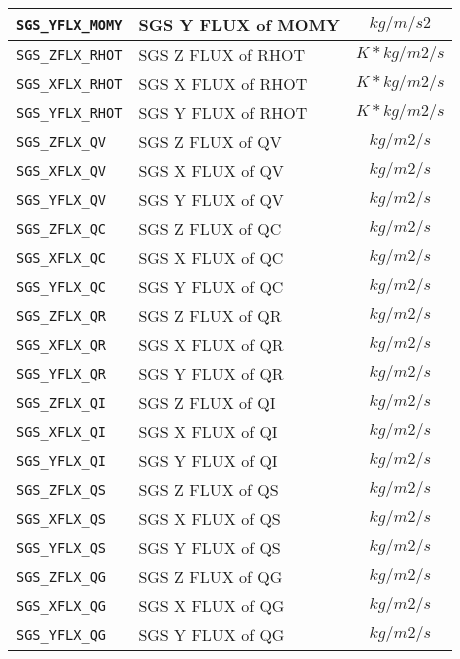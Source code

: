 \begin{tabularx}{150mm}{|l|X|c|}
  \verb|SGS_YFLX_MOMY| & SGS Y FLUX of MOMY & $kg/m/s2$ \\\hline
  \verb|SGS_ZFLX_RHOT| & SGS Z FLUX of RHOT & $K*kg/m2/s$ \\\hline
  \verb|SGS_XFLX_RHOT| & SGS X FLUX of RHOT & $K*kg/m2/s$ \\\hline
  \verb|SGS_YFLX_RHOT| & SGS Y FLUX of RHOT & $K*kg/m2/s$ \\\hline
  \verb|SGS_ZFLX_QV|   & SGS Z FLUX of QV   & $kg/m2/s$ \\\hline
  \verb|SGS_XFLX_QV|   & SGS X FLUX of QV   & $kg/m2/s$ \\\hline
  \verb|SGS_YFLX_QV|   & SGS Y FLUX of QV   & $kg/m2/s$ \\\hline
  \verb|SGS_ZFLX_QC|   & SGS Z FLUX of QC   & $kg/m2/s$ \\\hline
  \verb|SGS_XFLX_QC|   & SGS X FLUX of QC   & $kg/m2/s$ \\\hline
  \verb|SGS_YFLX_QC|   & SGS Y FLUX of QC   & $kg/m2/s$ \\\hline
  \verb|SGS_ZFLX_QR|   & SGS Z FLUX of QR   & $kg/m2/s$ \\\hline
  \verb|SGS_XFLX_QR|   & SGS X FLUX of QR   & $kg/m2/s$ \\\hline
  \verb|SGS_YFLX_QR|   & SGS Y FLUX of QR   & $kg/m2/s$ \\\hline
  \verb|SGS_ZFLX_QI|   & SGS Z FLUX of QI   & $kg/m2/s$ \\\hline
  \verb|SGS_XFLX_QI|   & SGS X FLUX of QI   & $kg/m2/s$ \\\hline
  \verb|SGS_YFLX_QI|   & SGS Y FLUX of QI   & $kg/m2/s$ \\\hline
  \verb|SGS_ZFLX_QS|   & SGS Z FLUX of QS   & $kg/m2/s$ \\\hline
  \verb|SGS_XFLX_QS|   & SGS X FLUX of QS   & $kg/m2/s$ \\\hline
  \verb|SGS_YFLX_QS|   & SGS Y FLUX of QS   & $kg/m2/s$ \\\hline
  \verb|SGS_ZFLX_QG|   & SGS Z FLUX of QG   & $kg/m2/s$ \\\hline
  \verb|SGS_XFLX_QG|   & SGS X FLUX of QG   & $kg/m2/s$ \\\hline
  \verb|SGS_YFLX_QG|   & SGS Y FLUX of QG   & $kg/m2/s$ \\\hline
 \end{tabularx}

